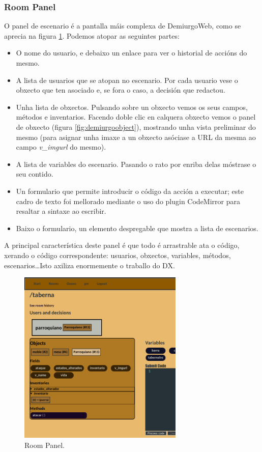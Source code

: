 \subsubsection{Room Panel}
O panel de escenario é a pantalla máis complexa de DemiurgoWeb, como se aprecia
na figura \ref{fig:demiurgoroompanel}. Podemos atopar as seguintes partes:
\begin{itemize}
  \item O nome do usuario, e debaixo un enlace para ver o historial de accións
  do mesmo.
  \item A lista de usuarios que se atopan no escenario. Por cada usuario vese o
  obxecto que ten asociado e, se fora o caso, a decisión que redactou.
  \item Unha lista de obxectos. Pulsando sobre un obxecto vemos os seus campos,
  métodos e inventarios. Facendo doble clic en calquera obxecto vemos o panel de
  obxecto (figura \ref{fig:demiurgoobject}), mostrando unha vista preliminar do
  mesmo (para asignar unha imaxe a un obxecto asóciase a URL da mesma ao
  campo \textit{v\_imgurl} do mesmo).
  \item A lista de variables do escenario. Pasando o rato por enriba delas
  móstrase o seu contido.
  \item Un formulario que permite introducir o código da acción a executar; este
  cadro de texto foi mellorado mediante o uso do plugin CodeMirror para resaltar
  a sintaxe ao escribir.
  \item Baixo o formulario, un elemento despregable que mostra a lista de
  escenarios.
\end{itemize}
A principal característica deste panel é que todo é arrastrable ata o código,
xerando o código correspondente: usuarios, obxectos, variables, métodos,
escenarios\ldots Isto axiliza enormemente o traballo do DX.

\begin{figure}
\centerline{\includegraphics[width=0.7\textwidth]{figuras/demiurgo_roompanel.png}}
\caption{Room Panel.}
\label{fig:demiurgoroompanel}
\end{figure}


